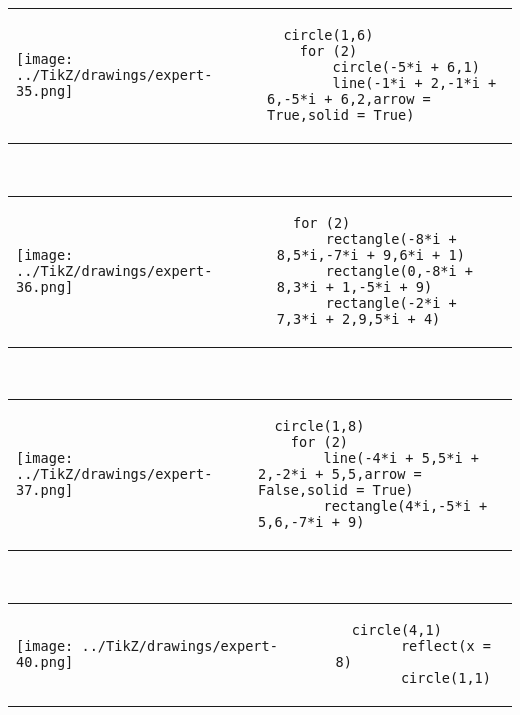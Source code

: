             \begin{tabular}{ll}
    \texttt{[image: ../TikZ/drawings/expert-35.png]}&
    
        \begin{minipage}{10cm}
        \begin{verbatim}
  circle(1,6)
    for (2)
        circle(-5*i + 6,1)
        line(-1*i + 2,-1*i + 6,-5*i + 6,2,arrow = True,solid = True)
        \end{verbatim}
\end{minipage}

    \end{tabular}        
            \\

            \begin{tabular}{ll}
    \texttt{[image: ../TikZ/drawings/expert-36.png]}&
    
        \begin{minipage}{10cm}
        \begin{verbatim}
  for (2)
      rectangle(-8*i + 8,5*i,-7*i + 9,6*i + 1)
      rectangle(0,-8*i + 8,3*i + 1,-5*i + 9)
      rectangle(-2*i + 7,3*i + 2,9,5*i + 4)
        \end{verbatim}
\end{minipage}

    \end{tabular}        
            \\

            \begin{tabular}{ll}
    \texttt{[image: ../TikZ/drawings/expert-37.png]}&
    
        \begin{minipage}{10cm}
        \begin{verbatim}
  circle(1,8)
    for (2)
        line(-4*i + 5,5*i + 2,-2*i + 5,5,arrow = False,solid = True)
        rectangle(4*i,-5*i + 5,6,-7*i + 9)
        \end{verbatim}
\end{minipage}

    \end{tabular}        
            \\

            \begin{tabular}{ll}
    \texttt{[image: ../TikZ/drawings/expert-40.png]}&
    
        \begin{minipage}{10cm}
        \begin{verbatim}
  circle(4,1)
        reflect(x = 8)
        circle(1,1)
        \end{verbatim}
\end{minipage}

    \end{tabular}        
            \\

